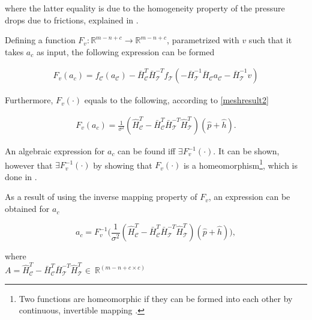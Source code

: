 where the latter equality is due to the homogeneity property of the pressure drops due to frictions, explained in .

Defining a function $F_v : \mathbb{R}^{m-n+c} \rightarrow \mathbb{R}^{m-n+c}$, parametrized with $v$ such that it takes $a_c$ as input, the following expression can be formed

\begin{equation}
\begin{split}
\label{Fv}
F_v(a_c) = f_{\mathcal{C}}(a_{\mathcal{C}}) -\bar{H}^T_{\mathcal{C}}\bar{H}^{-T}_{\mathcal{T}} f_{\mathcal{T}}(-\bar{H}^{-1}_{\mathcal{T}} \bar{H}_{\mathcal{C}} a_{\mathcal{C}} - \bar{H}^{-1}_{\mathcal{T}} v) 
\end{split}
\end{equation}

Furthermore, $F_v(\cdot)$ equals to the following, according to \eqref{meshresult2}

\begin{equation}
\begin{split}
\label{Fv1}
F_v(a_c) = \frac{1}{\sigma^2} (\hat{H}^T_{\mathcal{C}} -\bar{H}^T_{\mathcal{C}}\bar{H}^{-T}_{\mathcal{T}}\hat{H}^T_{\mathcal{T}})(\hat{p} + \hat{h}).
\end{split}
\end{equation}

An algebraic expression for $a_c$ can be found iff $\exists F_v^{-1}(\cdot)$. It can be shown, however that $\exists F_v^{-1}(\cdot)$ by showing that $F_v(\cdot)$ is a homeomorphism\footnote{Two functions are homeomorphic if they can be formed into each other by continuous, invertible mapping \cite{krantz2012handbook}.}, which is done in \cite{oneinput_paper}.  

As a result of using the inverse mapping property of $F_v$, an expression can be obtained for $a_c$

\begin{equation}
\label{Fv2}
a_c = F_v^{-1} \Big(\frac{1}{\sigma^2} (\hat{H}^T_{\mathcal{C}} -\bar{H}^T_{\mathcal{C}}\bar{H}^{-T}_{\mathcal{T}}\hat{H}^T_{\mathcal{T}})(\hat{p} + \hat{h}) \Big),
\end{equation}

  \begin{minipage}[t]{0.60\textwidth}
where\\
\hspace*{8mm} $A = \hat{H}^T_{\mathcal{C}} -\bar{H}^T_{\mathcal{C}}\bar{H}^{-T}_{\mathcal{T}}\hat{H}^T_{\mathcal{T}}\in \: \mathbb{R}^{(m-n+c \times c)}$ 
\end{minipage}


